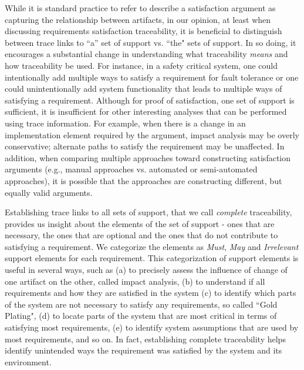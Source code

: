 
While it is standard practice to refer to describe a satisfaction argument as capturing the relationship between artifacts, in our opinion, at least when discussing requirements satisfaction traceability, it is beneficial to distinguish between trace links to ``a'' set of support vs. ``the" sets of support. In so doing, it encourages a substantial change in understanding what traceability {\em means} and how traceability be used. For instance, in a safety critical system, one could intentionally add multiple ways to satisfy a requirement for fault tolerance or one could unintentionally add system functionality that leads to multiple ways of satisfying a requirement. Although for proof of satisfaction, one set of support is sufficient, it is insufficient for other interesting analyses that can be performed using trace information. For example, when there is a change in an implementation element required by the argument, impact analysis may be overly conservative; alternate paths to satisfy the requirement may be unaffected.  In addition, when comparing multiple approaches toward constructing satisfaction arguments (e.g., manual approaches vs. automated or semi-automated approaches), it is possible that the approaches are constructing different, but equally valid arguments.


Establishing trace links to all sets of support, that we call \emph{complete} traceability, provides us insight about the elements of the set of support - ones that are necessary, the ones that are optional and the ones that do not contribute to satisfying a requirement.  We categorize the elements as \emph{Must}, \emph{May} and \emph{Irrelevant} support elements for each requirement.  This categorization of support elements is useful in several ways, such as (a) to precisely assess the influence of change of one artifact on the other, called impact analysis, (b) to understand if all requirements and how they are satisfied in the system (c) to identify which parts of the system are not necessary to satisfy any requirements, so called ``Gold Plating", (d) to locate parts of the system that are most critical in terms of satisfying most requirements, (e) to identify system assumptions that are used by most requirements, and so on. In fact, establishing complete traceability helps identify unintended ways the requirement was satisfied by the system and its environment.

